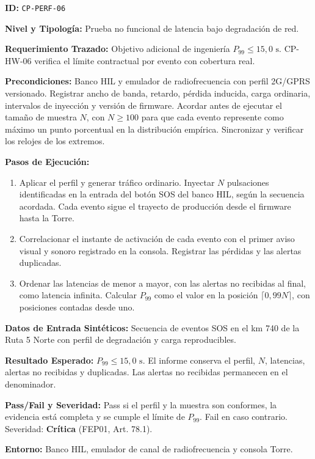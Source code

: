 \par\noindent\textbf{ID:} \texttt{CP-\allowbreak{}PERF-\allowbreak{}06}\par
\par\noindent\textbf{Nivel y Tipología:} Prueba no funcional de latencia bajo degradación de red.\par
\par\noindent\textbf{Requerimiento Trazado:} Objetivo adicional de ingeniería \(P_{99} \le 15{,}0\text{ s}\). CP-HW-06 verifica el límite contractual por evento con cobertura real.\par
\par\noindent\textbf{Precondiciones:} Banco HIL y emulador de radiofrecuencia con perfil 2G/GPRS versionado. Registrar ancho de banda, retardo, pérdida inducida, carga ordinaria, intervalos de inyección y versión de firmware. Acordar antes de ejecutar el tamaño de muestra \(N\), con \(N\ge100\) para que cada evento represente como máximo un punto porcentual en la distribución empírica. Sincronizar y verificar los relojes de los extremos.\par
\par\noindent\textbf{Pasos de Ejecución:}\par
\begin{enumerate}
\item Aplicar el perfil y generar tráfico ordinario. Inyectar \(N\) pulsaciones identificadas en la entrada del botón SOS del banco HIL, según la secuencia acordada. Cada evento sigue el trayecto de producción desde el firmware hasta la Torre.
\item Correlacionar el instante de activación de cada evento con el primer aviso visual y sonoro registrado en la consola. Registrar las pérdidas y las alertas duplicadas.
\item Ordenar las latencias de menor a mayor, con las alertas no recibidas al final, como latencia infinita. Calcular \(P_{99}\) como el valor en la posición \(\lceil 0{,}99N\rceil\), con posiciones contadas desde uno.
\end{enumerate}
\par\noindent\textbf{Datos de Entrada Sintéticos:} Secuencia de eventos SOS en el km 740 de la Ruta 5 Norte con perfil de degradación y carga reproducibles.\par
\par\noindent\textbf{Resultado Esperado:} \(P_{99}\le15{,}0\text{ s}\). El informe conserva el perfil, \(N\), latencias, alertas no recibidas y duplicadas. Las alertas no recibidas permanecen en el denominador.\par
\par\noindent\textbf{Pass/Fail y Severidad:} Pass si el perfil y la muestra son conformes, la evidencia está completa y se cumple el límite de \(P_{99}\). Fail en caso contrario. Severidad: \textbf{Crítica} (FEP01, Art. 78.1).\par
\par\noindent\textbf{Entorno:} Banco HIL, emulador de canal de radiofrecuencia y consola Torre.\par

